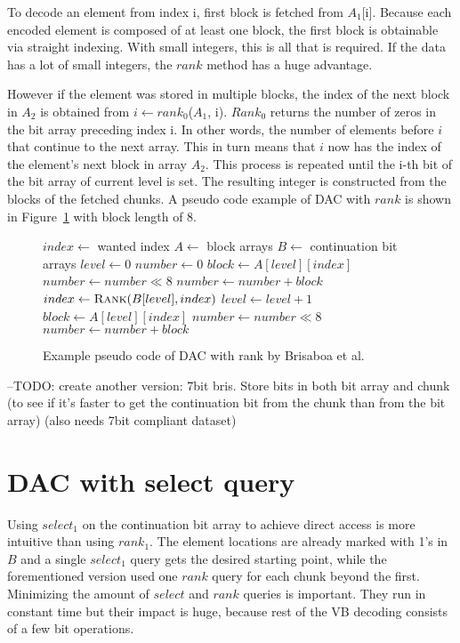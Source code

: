 To decode an element from index i, first block is fetched from $A_1$[i]. Because each encoded element is composed of at least one block, the first block is obtainable via straight indexing. With small integers, this 
is all that is required. If the data has a lot of small integers, the $rank$ method has a huge advantage. 

However if the element was stored in multiple blocks, the index of the next block in $A_2$ is obtained from $i \gets rank_0$($A_1$, i). $Rank_0$ 
returns the number of zeros in the bit array preceding index i. In other words, the number of elements before $i$ that continue to the next array. 
This in turn means that $i$ now has the index of the element's next block in array $A_2$.
This process is repeated until the i-th bit of the bit array of current level is set. The resulting integer is constructed from the blocks of the fetched chunks. A pseudo code example of DAC with $rank$ is shown in Figure~\ref{bris_pseudo} 
with block length of 8.


\begin{figure}[ht]
\centering
\begin{minipage}{0.5\linewidth}
\begin{algorithmic}
\State $index \gets $ wanted index
\State $A \gets $ block arrays
\State $B \gets $ continuation bit arrays
\State $level \gets 0$
\State $number \gets 0$
\State $block \gets A[level][index]$
\State $number \gets number \mathbin{\ll} 8$
\State $number \gets number + block$
\State $index \gets \Call{Rank}{B[level], index}$
\State $level \gets level + 1$
\EndWhile
\State $block \gets A[level][index]$
\State $number \gets number \mathbin{\ll} 8$
\State $number \gets number + block$
\end{algorithmic}
\end{minipage}
\caption{Example pseudo code of DAC with rank by Brisaboa et al.} \label{bris_pseudo}

\end{figure}

--TODO: create another version: 7bit bris. Store bits in both bit array and chunk (to see if it's faster to get the continuation bit from the chunk than from the bit array) (also needs 7bit compliant dataset)

\chapter{DAC with select query}

Using $select_1$ on the continuation bit array to achieve direct access is more intuitive than using $rank_1$. The element locations are already marked with 1's 
in $B$ and a single $select_1$ query gets the desired starting point, while the forementioned version \citep{Bri09} used one $rank$ query for each chunk beyond 
the first. Minimizing the amount of $select$ and $rank$ queries is important. They run in constant time but their impact is huge, because rest of the VB decoding 
consists of a few bit operations. 

